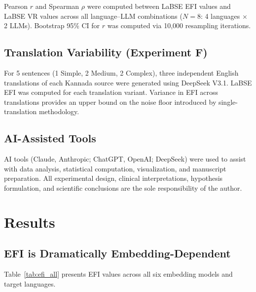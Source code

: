 \documentclass[11pt,a4paper]{article}
\begin{document}
Pearson $r$ and Spearman $\rho$ were computed between LaBSE EFI values and LaBSE VR
values across all language--LLM combinations ($N = 8$: 4 languages $\times$ 2 LLMs).
Bootstrap 95\% CI for $r$ was computed via 10,000 resampling iterations.

\subsection{Translation Variability (Experiment F)}

For 5 sentences (1 Simple, 2 Medium, 2 Complex), three independent English translations
of each Kannada source were generated using DeepSeek V3.1. LaBSE EFI was computed for
each translation variant. Variance in EFI across translations provides an upper bound
on the noise floor introduced by single-translation methodology.

\subsection{AI-Assisted Tools}
AI tools (Claude, Anthropic; ChatGPT, OpenAI; DeepSeek) were used to assist with data
analysis, statistical computation, visualization, and manuscript preparation. All
experimental design, clinical interpretations, hypothesis formulation, and scientific
conclusions are the sole responsibility of the author.

\section{Results}

\subsection{EFI is Dramatically Embedding-Dependent}

Table~\ref{tab:efi_all} presents EFI values across all six embedding models and target
languages.
\end{document}
